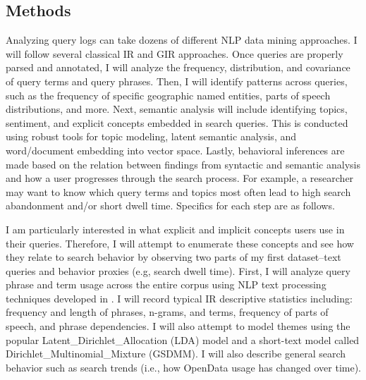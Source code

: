 \subsection{Methods}
Analyzing query logs can take dozens of different NLP data mining approaches. I will follow several classical IR and GIR approaches. Once queries are properly parsed and annotated, I will analyze the frequency, distribution, and covariance of query terms and query phrases. Then, I will identify patterns across queries, such as the frequency of specific geographic named entities, parts of speech distributions, and more. Next, semantic analysis will include identifying topics, sentiment, and explicit concepts embedded in search queries. This is conducted using robust tools for topic modeling, latent semantic analysis, and word/document embedding into vector space. Lastly, behavioral inferences are made based on the relation between findings from syntactic and semantic analysis and how a user progresses through the search process. For example, a researcher may want to know which query terms and topics most often lead to high search abandonment and/or short dwell time. Specifics for each step are as follows.

I am particularly interested in what explicit and implicit concepts users use in their queries. Therefore, I will attempt to enumerate these concepts and see how they relate to search behavior by observing two parts of my first dataset–text queries and behavior proxies (e.g, search dwell time). First, I will analyze query phrase and term usage across the entire corpus using NLP text processing techniques developed in \cite{Sanderson2007} \cite{Dittrich2015} \cite{Derungs2016} \cite{Gablasova2017} \cite{Hamzei2019b}. I will record typical IR descriptive statistics including: frequency and length of phrases, n-grams, and terms, frequency of parts of speech, and phrase dependencies. I will also attempt to model themes using the popular \gls{Latent_Dirichlet_Allocation} (\acrshort{LDA}) model and a short-text model called \gls{Dirichlet_Multinomial_Mixture} (\acrshort{GSDMM}). I will also describe general search behavior such as search trends (i.e., how OpenData usage has changed over time).

